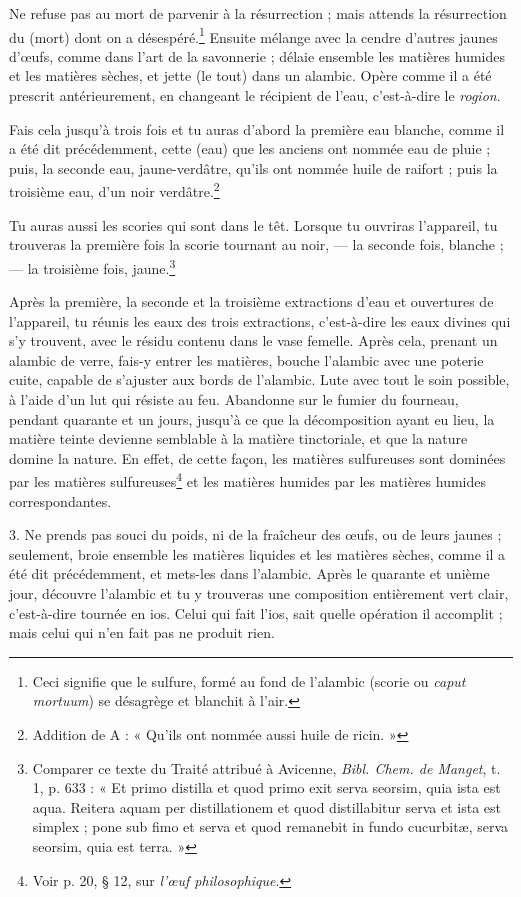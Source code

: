 \documentclass[a4paper, 11pt, oneside, polutonikogreek, french]{article}
\begin{document}
Ne refuse pas au mort de parvenir à la résurrection ; mais attends la résurrection du (mort) dont on a désespéré.\footnote{Ceci signifie que le sulfure, formé au fond de l'alambic (scorie ou \emph{caput mortuum}) se désagrège et blanchit à l'air.} Ensuite mélange avec la cendre d'autres jaunes d'œufs, comme dans l'art de la savonnerie ; délaie ensemble les matières humides et les matières sèches, et jette (le tout) dans un alambic. Opère comme il a été prescrit antérieurement, en changeant le récipient de l'eau, c'est-à-dire le \emph{rogion}.

Fais cela jusqu'à trois fois et tu auras d'abord la première eau blanche, comme il a été dit précédemment, cette (eau) que les anciens ont nommée eau de pluie ; puis, la seconde eau, jaune-verdâtre, qu'ils ont nommée huile de raifort ; puis la troisième eau, d'un noir verdâtre.\footnote{Addition de A : « Qu'ils ont nommée aussi huile de ricin. »}

Tu auras aussi les scories qui sont dans le têt. Lorsque tu ouvriras l'appareil, tu trouveras la première fois la scorie tournant au noir, --- la seconde fois, blanche ;--- la troisième fois, jaune.\footnote{Comparer ce texte du Traité attribué à Avicenne, \emph{Bibl. Chem. de Manget}, t. 1, p. 633 : « Et primo distilla et quod primo exit serva seorsim, quia ista est aqua. Reitera aquam per distillationem et quod distillabitur serva et ista est simplex ; pone sub fimo et serva et quod remanebit in fundo cucurbitæ, serva seorsim, quia est terra. »}

Après la première, la seconde et la troisième extractions d'eau et ouvertures de l'appareil, tu réunis les eaux des trois extractions, c'est-à-dire les eaux divines qui s'y trouvent, avec le résidu contenu dans le vase femelle. Après cela, prenant un alambic de verre, fais-y entrer les matières, bouche l'alambic avec une poterie cuite, capable de s'ajuster aux bords de l'alambic. Lute avec tout le soin possible, à l'aide d'un lut qui résiste au feu. Abandonne sur le fumier du fourneau, pendant quarante et un jours, jusqu'à ce que la décomposition ayant eu lieu, la matière teinte devienne semblable à la matière tinctoriale, et que la nature domine la nature. En effet, de cette façon, les matières sulfureuses sont dominées par les matières sulfureuses\footnote{Voir p. 20, § 12, sur \emph{l'œuf philosophique}.} et les matières humides par les matières humides correspondantes.

3. Ne prends pas souci du poids, ni de la fraîcheur des œufs, ou de leurs jaunes ; seulement, broie ensemble les matières liquides et les matières sèches, comme il a été dit précédemment, et mets-les dans l'alambic. Après le quarante et unième jour, découvre l'alambic et tu y trouveras une composition entièrement vert clair, c'est-à-dire tournée en ios. Celui qui fait l'ios, sait quelle opération il accomplit ; mais celui qui n'en fait pas ne produit rien.
\end{document}
